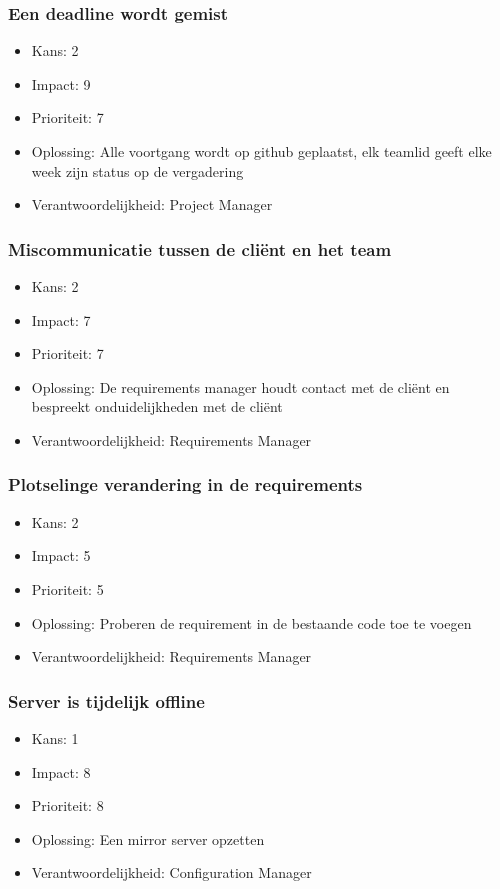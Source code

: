 \subsubsection{Een deadline wordt gemist}
\begin{itemize}
\item Kans: 2
\item Impact: 9
\item Prioriteit: 7
\item Oplossing: Alle voortgang wordt op github geplaatst, elk teamlid geeft elke week zijn status op de vergadering
\item Verantwoordelijkheid: Project Manager
\end{itemize}

\subsubsection{Miscommunicatie tussen de cliënt en het team}
\begin{itemize}
\item Kans: 2
\item Impact: 7
\item Prioriteit: 7
\item Oplossing: De requirements manager houdt contact met de cliënt en bespreekt onduidelijkheden met de cliënt
\item Verantwoordelijkheid: Requirements Manager
\end{itemize}

\subsubsection{Plotselinge verandering in de requirements}
\begin{itemize}
\item Kans: 2
\item Impact: 5
\item Prioriteit: 5
\item Oplossing: Proberen de requirement in de bestaande code toe te voegen
\item Verantwoordelijkheid: Requirements Manager
\end{itemize}

\subsubsection{Server is tijdelijk offline}
\begin{itemize}
\item Kans: 1
\item Impact: 8
\item Prioriteit: 8
\item Oplossing: Een mirror server opzetten
\item Verantwoordelijkheid: Configuration Manager
\end{itemize}

